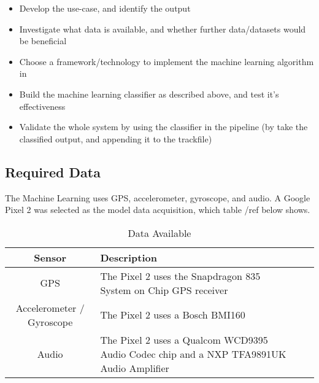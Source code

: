 \documentclass{UoNMCHA}
\numberwithin{equation}{section}
\begin{document}
\begin{itemize}
    \item Develop the use-case, and identify the output
    \item Investigate what data is available, and whether further data/datasets would be beneficial
    \item Choose a framework/technology to implement the machine learning algorithm in
    \item Build the machine learning classifier as described above, and test it's effectiveness
    \item Validate the whole system by using the classifier in the pipeline (by take the classified output, and appending it to the trackfile)
\end{itemize}




\subsection{Required Data}
The Machine Learning uses GPS, accelerometer, gyroscope, and audio. A Google Pixel 2 was selected as the model data acquisition, which table /ref{} below shows.
\begin{table}[h!] 
    \begin{center}
        \caption{Data Available \cite{pixelteardown}}\label{tab:AndroidSensorsAvailable}
        {\footnotesize
            \begin{tabular}{clll}
                \hline\hline Sensor & Description \\ \hline 
                GPS & The Pixel 2 uses the Snapdragon 835 System on Chip GPS receiver\\
                Accelerometer / Gyroscope & The Pixel 2 uses a Bosch BMI160 \\
                Audio & The Pixel 2 uses a Qualcom WCD9395 Audio Codec chip and a NXP TFA9891UK Audio Amplifier \\ \hline
            \end{tabular}
        }
    \end{center}
\end{table}
\end{document}
